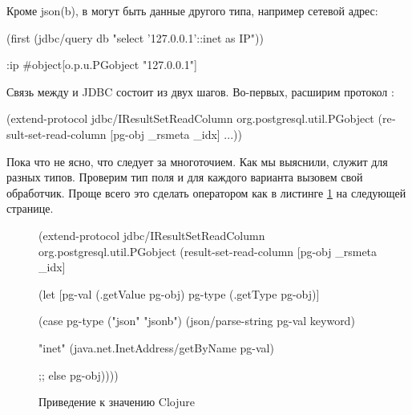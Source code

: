 Кроме json(b), в  могут быть данные другого типа, например сетевой адрес:

\begin{english}
  \begin{clojure}
(first (jdbc/query db "select '127.0.0.1'::inet as IP"))

{:ip #object[o.p.u.PGobject "127.0.0.1"]}
  \end{clojure}
\end{english}

Связь между  и JDBC состоит из двух шагов. Во-первых, расширим протокол :

\begin{english}
  \begin{clojure}
(extend-protocol jdbc/IResultSetReadColumn
  org.postgresql.util.PGobject
  (result-set-read-column [pg-obj _rsmeta _idx]
    ...))
  \end{clojure}
\end{english}

Пока что не ясно, что следует за многоточием. Как мы выяснили,  служит для разных типов. Проверим тип поля и для каждого варианта вызовем свой обработчик. Проще всего это сделать оператором  как в листинге \ref{fig:pg-obj-case} на следующей странице.

\begin{figure}[ht!]

\begin{english}
  \begin{clojure/lines}
(extend-protocol jdbc/IResultSetReadColumn
  org.postgresql.util.PGobject
  (result-set-read-column [pg-obj _rsmeta _idx]

    (let [pg-val (.getValue pg-obj)
          pg-type (.getType pg-obj)]

      (case pg-type
        ("json" "jsonb")
        (json/parse-string pg-val keyword)

        "inet"
        (java.net.InetAddress/getByName pg-val)

        ;; else
        pg-obj))))
  \end{clojure/lines}
\end{english}

\caption{Приведение  к значению Clojure}
\label{fig:pg-obj-case}

\end{figure}

\def\urlcheshire{https://github.com/dakrone/cheshire}

